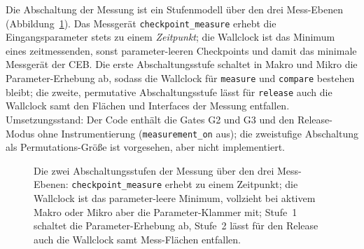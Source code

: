 \begin{nurkurz}
Die Abschaltung der Messung ist ein Stufenmodell über den drei Mess-Ebenen
(Abbildung~\ref{fig:abschaltungsstufen}). Das Messgerät \texttt{checkpoint\_measure} erhebt die
Eingangsparameter stets zu einem \emph{Zeitpunkt}; die Wallclock ist das Minimum eines zeitmessenden,
sonst parameter-leeren Checkpoints und damit das minimale Messgerät der CEB\@. Die erste Abschaltungsstufe
schaltet in Makro und Mikro die Parameter-Erhebung ab, sodass die Wallclock für \texttt{measure} und
\texttt{compare} bestehen bleibt; die zweite, permutative Abschaltungsstufe lässt für \texttt{release}
auch die Wallclock samt den Flächen und Interfaces der Messung entfallen. Umsetzungsstand: Der Code
enthält die Gates G2 und G3 und den Release-Modus ohne Instrumentierung (\texttt{measurement\_on} aus);
die zweistufige Abschaltung als Permutations-Größe ist vorgesehen, aber nicht implementiert.
\begin{figure}[htbp]\centering
\caption[Die zwei Abschaltungsstufen der Messung]{Die zwei Abschaltungsstufen der Messung über den drei Mess-Ebenen: \texttt{checkpoint\_measure}
erhebt zu einem Zeitpunkt; die Wallclock ist das parameter-leere Minimum, vollzieht bei aktivem Makro oder
Mikro aber die Parameter-Klammer mit; Stufe~1 schaltet die Parameter-Erhebung ab, Stufe~2 lässt für den
Release auch die Wallclock samt Mess-Flächen entfallen.}\label{fig:abschaltungsstufen}
\end{figure}
\end{nurkurz}

